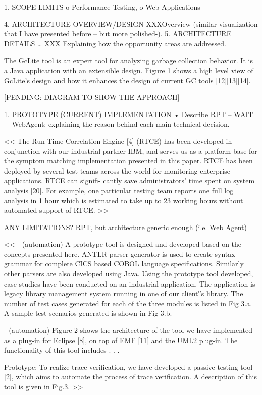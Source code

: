 \documentclass[runningheads,a4paper]{llncs}
\begin{document}
1.	SCOPE LIMITS
o	Performance Testing, 
o	Web Applications

4.	ARCHITECTURE OVERVIEW/DESIGN
XXXOverview (similar visualization that I have presented before – but more polished-).
5.	ARCHITECTURE DETAILS …
XXX Explaining how the opportunity areas are addressed.

The GcLite tool is an expert tool for analyzing garbage
collection behavior. It is a Java application with an extensible design. Figure 1 shows a high level view of GcLite’s design and how it
enhances the design of current GC tools
[12][13][14].

[PENDING: DIAGRAM TO SHOW THE APPROACH]

1.	PROTOTYPE (CURRENT) IMPLEMENTATION
•	Describe RPT – WAIT + WebAgent; explaining the reason behind each main technical decision.

<<
The Run-Time Correlation Engine [4] (RTCE) has been developed in conjunction
with our industrial partner IBM, and serves us as a platform base for the symptom 
matching implementation presented in this paper. RTCE has been deployed by several test 
teams across the world for monitoring enterprise applications. RTCE can signifi- cantly 
save administrators’ time spent on system analysis [20]. For example, one particular 
testing team reports one full log analysis in 1 hour which is estimated to take up to 23 
working hours without automated support of RTCE.
>>

ANY LIMITATIONS?
RPT, but architecture generic enough (i.e. Web Agent)

<<
- (automation) A prototype tool is designed and developed based on the concepts presented here.
ANTLR parser generator is used to create syntax grammar for complete CICS based
COBOL language specifications. Similarly other parsers are also developed using
Java. Using the prototype tool developed, case studies have been conducted on an
industrial application. The application is legacy library management system running
in one of our client‟s library. The number of test cases generated for each of the three
modules is listed in Fig 3.a. A sample test scenarios generated is shown in Fig 3.b.

- (automation) Figure 2 shows the architecture of the tool we have implemented as a plug-in for
Eclipse [8], on top of EMF [11] and the UML2 plug-in. The functionality of this tool
includes . . .

Prototype: To realize trace verification, we have developed a passive testing tool [2], which
aims to automate the process of trace verification. A description of this tool is
given in Fig.3.
>>
\end{document}
